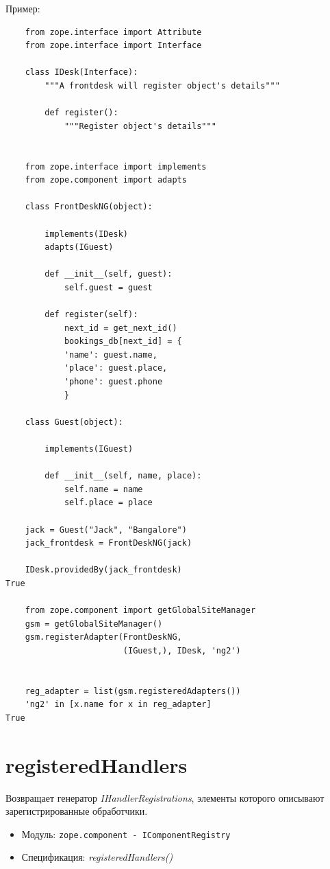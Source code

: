 \documentclass[a4paper,openany,twoside,final]{book}
\providecommand*{\DUroletitlereference}[1]{\textsl{#1}}
\begin{document}
Пример:

\begin{verbatim}
    from zope.interface import Attribute
    from zope.interface import Interface

    class IDesk(Interface):
        """A frontdesk will register object's details"""

        def register():
            """Register object's details"""


    from zope.interface import implements
    from zope.component import adapts

    class FrontDeskNG(object):

        implements(IDesk)
        adapts(IGuest)

        def __init__(self, guest):
            self.guest = guest

        def register(self):
            next_id = get_next_id()
            bookings_db[next_id] = {
            'name': guest.name,
            'place': guest.place,
            'phone': guest.phone
            }

    class Guest(object):

        implements(IGuest)

        def __init__(self, name, place):
            self.name = name
            self.place = place

    jack = Guest("Jack", "Bangalore")
    jack_frontdesk = FrontDeskNG(jack)

    IDesk.providedBy(jack_frontdesk)
True

    from zope.component import getGlobalSiteManager
    gsm = getGlobalSiteManager()
    gsm.registerAdapter(FrontDeskNG,
                        (IGuest,), IDesk, 'ng2')


    reg_adapter = list(gsm.registeredAdapters())
    'ng2' in [x.name for x in reg_adapter]
True
\end{verbatim}


\section*{registeredHandlers%
  \label{registeredhandlers}%
}

Возвращает генератор \DUroletitlereference{IHandlerRegistrations}, элементы которого описывают зарегистрированные обработчики.

\begin{itemize}

\item Модуль: \texttt{zope.component - IComponentRegistry}

\item Спецификация: \DUroletitlereference{registeredHandlers()}

\end{itemize}
\end{document}

